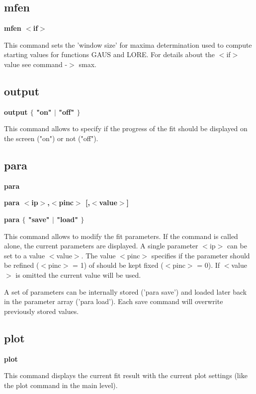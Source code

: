 \subsection*{mfen}
{\bf mfen $ <$if$> $ \par }
\par
\vspace{3pt}
This command sets the 'window size' for maxima determination used 
to compute starting values for functions GAUS and LORE. For details 
about the $ <$if$> $ value see command -$> $ smax. 
\subsection*{output}
{\bf output $ \{$ "on" $| $ "off" $\} $ \par }
\par
\vspace{3pt}
This command allows to specify if the progress of the fit should be 
displayed on the screen ("on") or not ("off"). 
\subsection*{para}
{\bf para \par }
{\bf para $ <$ip$> $,$ <$pinc$> $ [,$ <$value$> $] \par }
{\bf para $ \{$ "save" $| $ "load" $\} $ \par }
\par
\vspace{3pt}
This command allows to modify the fit parameters. If the command 
is called alone, the current parameters are displayed. A single 
parameter $ <$ip$> $ can be set to a value $ <$value$> $. The value $ <$pinc$> $ 
specifies if the parameter should be refined ($ <$pinc$> $ = 1) of should 
be kept fixed ($ <$pinc$> $ = 0). If $ <$value$> $ is omitted the current value 
will be used. 
\par
A set of parameters can be internally stored ('para save') and loaded 
later back in the parameter array ('para load'). Each save command 
will overwrite previously stored values. 
\subsection*{plot}
{\bf plot \par }
\par
\vspace{3pt}
This command displays the current fit result with the current plot 
settings (like the plot command in the main level). 
